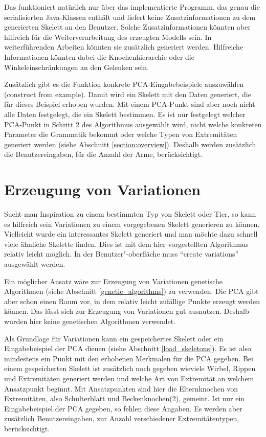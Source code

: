 Das funktioniert natürlich nur über das implementierte Programm, das genau die serialisierten Java-Klassen enthält und liefert keine Zusatzinformationen zu dem generierten Skelett an den Benutzer. Solche Zusatzinformationen könnten aber hilfreich für die Weiterverarbeitung des erzeugten Modells sein. In weiterführenden Arbeiten könnten sie zusätzlich generiert werden. Hilfreiche Informationen könnten dabei \zb die Knochenhierarchie oder die Winkeleinschränkungen an den Gelenken sein.

Zusätzlich gibt es die Funktion konkrete PCA-Eingabebeispiele auszuwählen (construct from example). Damit wird ein Skelett mit den Daten generiert, die für dieses Beispiel erhoben wurden. Mit einem PCA-Punkt sind aber noch nicht alle Daten festgelegt, die ein Skelett bestimmen. Es ist nur festgelegt welcher PCA-Punkt in Schritt 2 des Algorithmus ausgewählt wird, nicht welche konkreten Parameter die Grammatik bekommt oder welche Typen von Extremitäten generiert werden (siehe Abschnitt \ref{section:overview}). Deshalb werden zusätzlich die Benutzereingaben, \zb für die Anzahl der Arme, berücksichtigt.


\section{Erzeugung von Variationen}

Sucht man Inspiration zu einem bestimmten Typ von Skelett oder Tier, so kann es hilfreich sein Variationen zu einem vorgegebenen Skelett generieren zu können. 
Vielleicht wurde ein interessantes Skelett generiert und man möchte dazu schnell viele ähnliche Skelette finden.
Dies ist mit dem hier vorgestellten Algorithmus relativ leicht möglich. In der Benutzer"-oberfläche muss "`create variations"' ausgewählt werden.

Ein möglicher Ansatz wäre zur Erzeugung von Variationen genetische Algorithmen (siehe Abschnitt \ref{genetic_algorithms}) zu verwenden. Die PCA gibt aber schon einen Raum vor, in dem relativ leicht zufällige Punkte erzeugt werden können. Das lässt sich zur Erzeugung von Variationen gut ausnutzen. Deshalb wurden hier keine genetischen Algorithmen verwendet. 

Als Grundlage für Variationen kann ein gespeichertes Skelett oder ein Eingabebeispiel der PCA dienen (siehe Abschnitt \ref{load_skeletons}). Es ist also mindestens ein Punkt mit den erhobenen Merkmalen für die PCA gegeben. Bei einem gespeicherten Skelett ist zusätzlich noch gegeben wieviele Wirbel, Rippen und Extremitäten generiert werden und welche Art von Extremität an welchem Ansatzpunkt beginnt. Mit Ansatzpunkten sind hier die Elternknochen von Extremitäten, also Schulterblatt und Beckenknochen(2), gemeint.
Ist nur ein Eingabebeispiel der PCA gegeben, so fehlen diese Angaben. Es werden aber zusätzlich Benutzereingaben, \zb zur Anzahl verschiedener Extremitätentypen, berücksichtigt.

